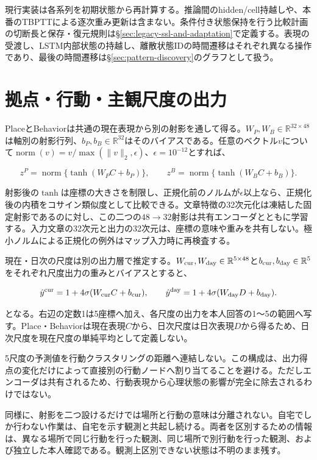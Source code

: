 現行実装は各系列を初期状態から再計算する。推論間のhidden/cell持越しや、本番のTBPTTによる逐次重み更新は含まない。条件付き状態保持を行う比較計画の切断長と保存・復元規則は§\ref{sec:legacy-ssl-and-adaptation}で定義する。表現の受渡し、LSTM内部状態の持越し、離散状態IDの時間遷移はそれぞれ異なる操作であり、最後の時間遷移は§\ref{sec:pattern-discovery}のグラフとして扱う。

\section{拠点・行動・主観尺度の出力}

PlaceとBehaviorは共通の現在表現から別の射影を通して得る。\(W_P,W_B\in\mathbb R^{32\times48}\)は軸別の射影行列、\(b_P,b_B\in\mathbb R^{32}\)はそのバイアスである。任意のベクトル\(v\)について\(\operatorname{norm}(v)=v/\max(\lVert v\rVert_2,\epsilon)\)、\(\epsilon=10^{-12}\)とすれば、

\[
z^P=\operatorname{norm}\{\tanh(W_PC+b_P)\},\qquad
z^B=\operatorname{norm}\{\tanh(W_BC+b_B)\}.
\]

射影後の\(\tanh\)は座標の大きさを制限し、正規化前のノルムが\(\epsilon\)以上なら、正規化後の内積をコサイン類似度として比較できる。文章特徴の32次元化は凍結した固定射影であるのに対し、この二つの\(48\to32\)射影は共有エンコーダとともに学習する。入力文章の32次元と出力の32次元は、座標の意味や重みを共有しない。極小ノルムによる正規化の例外はマップ入力時に再検査する。

現在・日次の尺度は別の出力層で推定する。\(W_{\rm cur},W_{\rm day}\in\mathbb R^{5\times48}\)と\(b_{\rm cur},b_{\rm day}\in\mathbb R^5\)をそれぞれ尺度出力の重みとバイアスとすると、

\[
\hat y^{\rm cur}=1+4\sigma(W_{\rm cur}C+b_{\rm cur}),\qquad
\hat y^{\rm day}=1+4\sigma(W_{\rm day}D+b_{\rm day}).
\]

となる。右辺の定数1は5座標へ加え、各尺度の出力を本人回答の1〜5の範囲へ写す。Place・Behaviorは現在表現\(C\)から、日次尺度は日次表現\(D\)から得るため、日次尺度を現在尺度の単純平均として定義しない。

5尺度の予測値を行動クラスタリングの距離へ連結しない。この構成は、出力得点の変化だけによって直接別の行動ノードへ割り当てることを避ける。ただしエンコーダは共有されるため、行動表現から心理状態の影響が完全に除去されるわけではない。

同様に、射影を二つ設けるだけでは場所と行動の意味は分離されない。自宅でしか行わない作業は、自宅を示す観測と共起し続ける。両者を区別するための情報は、異なる場所で同じ行動を行った観測、同じ場所で別行動を行った観測、および独立した本人確認である。観測上区別できない状態は不明のまま残す。


